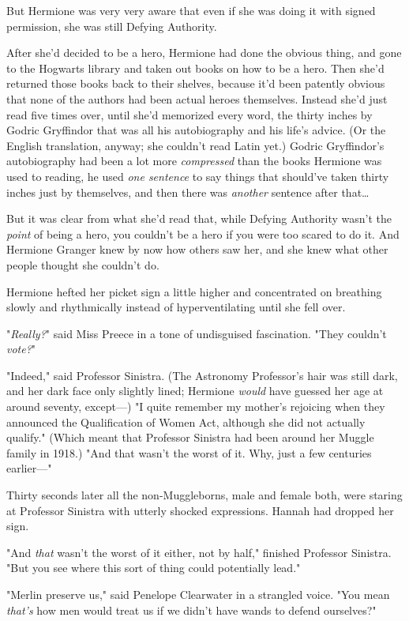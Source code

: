 But Hermione was very very aware that even if she was doing it with signed
permission, she was still Defying Authority.

After she'd decided to be a hero, Hermione had done the obvious thing, and gone
to the Hogwarts library and taken out books on how to be a hero. Then she'd
returned those books back to their shelves, because it'd been patently obvious
that none of the authors had been actual heroes themselves. Instead she'd just
read five times over, until she'd memorized every word, the thirty inches by
Godric Gryffindor that was all his autobiography and his life's advice. (Or the
English translation, anyway; she couldn't read Latin yet.) Godric Gryffindor's
autobiography had been a lot more \emph{compressed} than the books Hermione was
used to reading, he used \emph{one sentence} to say things that should've taken
thirty inches just by themselves, and then there was \emph{another} sentence
after that{\ldots}

But it was clear from what she'd read that, while Defying Authority wasn't the
\emph{point} of being a hero, you couldn't be a hero if you were too scared to
do it. And Hermione Granger knew by now how others saw her, and she knew what
other people thought she couldn't do.

Hermione hefted her picket sign a little higher and concentrated on breathing
slowly and rhythmically instead of hyperventilating until she fell over.

"\emph{Really?}" said Miss Preece in a tone of undisguised fascination. "They
couldn't \emph{vote?}"

"Indeed," said Professor Sinistra. (The Astronomy Professor's hair was still
dark, and her dark face only slightly lined; Hermione \emph{would} have guessed
her age at around seventy, except---) "I quite remember my mother's rejoicing
when they announced the Qualification of Women Act, although she did not
actually qualify." (Which meant that Professor Sinistra had been around her
Muggle family in 1918.) "And that wasn't the worst of it. Why, just a few
centuries earlier---"

Thirty seconds later all the non-Muggleborns, male and female both, were
staring at Professor Sinistra with utterly shocked expressions. Hannah had
dropped her sign.

"And \emph{that} wasn't the worst of it either, not by half," finished
Professor Sinistra. "But you see where this sort of thing could potentially
lead."

"Merlin preserve us," said Penelope Clearwater in a strangled voice. "You mean
\emph{that's} how men would treat us if we didn't have wands to defend
ourselves?"

